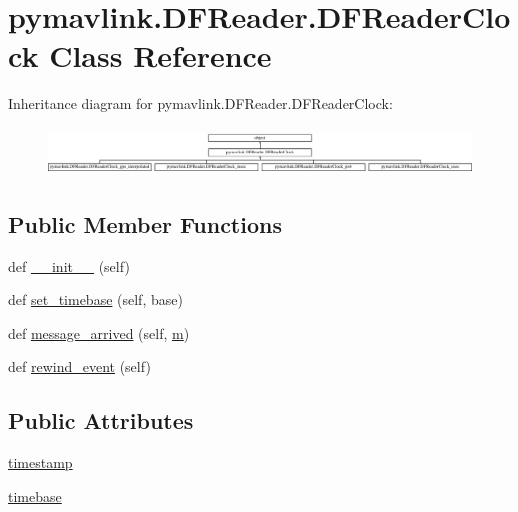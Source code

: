 \hypertarget{classpymavlink_1_1DFReader_1_1DFReaderClock}{}\section{pymavlink.\+D\+F\+Reader.\+D\+F\+Reader\+Clock Class Reference}
\label{classpymavlink_1_1DFReader_1_1DFReaderClock}
Inheritance diagram for pymavlink.\+D\+F\+Reader.\+D\+F\+Reader\+Clock\+:\begin{figure}[H]
\begin{center}
\leavevmode
\includegraphics[height=1.265060cm]{classpymavlink_1_1DFReader_1_1DFReaderClock}
\end{center}
\end{figure}
\subsection*{Public Member Functions}
\begin{DoxyCompactItemize}
\item 
def \mbox{\hyperlink{classpymavlink_1_1DFReader_1_1DFReaderClock_a99d4363951b5ef9866cbd021ca4dd80f}{\+\_\+\+\_\+init\+\_\+\+\_\+}} (self)
\item 
def \mbox{\hyperlink{classpymavlink_1_1DFReader_1_1DFReaderClock_a1f73678a08c32835bec25551701527e4}{set\+\_\+timebase}} (self, base)
\item 
def \mbox{\hyperlink{classpymavlink_1_1DFReader_1_1DFReaderClock_a49037f269d69afa423bc7c4a5e1983ba}{message\+\_\+arrived}} (self, \mbox{\hyperlink{namespacepymavlink_1_1DFReader_a41dcad484f9dfcaca656786d0882f168}{m}})
\item 
def \mbox{\hyperlink{classpymavlink_1_1DFReader_1_1DFReaderClock_a8216097142372761ae67e0ffd8ab5e69}{rewind\+\_\+event}} (self)
\end{DoxyCompactItemize}
\subsection*{Public Attributes}
\begin{DoxyCompactItemize}
\item 
\mbox{\hyperlink{classpymavlink_1_1DFReader_1_1DFReaderClock_abb110022a8a9204b253bd884ac9a5e13}{timestamp}}
\item 
\mbox{\hyperlink{classpymavlink_1_1DFReader_1_1DFReaderClock_a883d452615664051a5dd91788a21ee03}{timebase}}
\end{DoxyCompactItemize}


